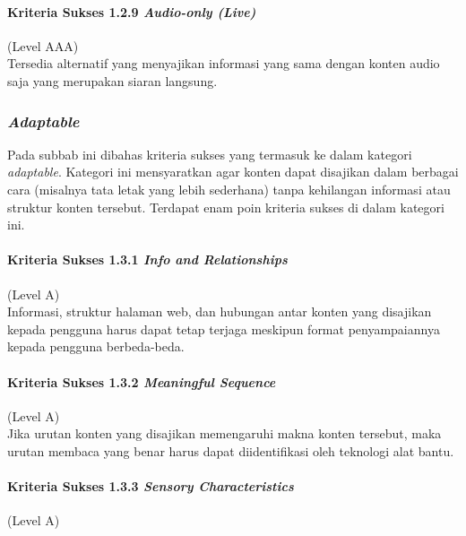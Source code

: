 \paragraph{Kriteria Sukses 1.2.9 \textit{Audio-only (Live)}}
\label{sec:kriteria_sukses_1.2.9}
(Level AAA)\\

Tersedia alternatif yang menyajikan informasi yang sama dengan konten audio saja yang merupakan siaran langsung.

\subsubsection{\textit{Adaptable}}
\label{sec:adaptable}
Pada subbab ini dibahas kriteria sukses yang termasuk ke dalam kategori \textit{adaptable}. Kategori ini mensyaratkan agar konten dapat disajikan dalam berbagai cara (misalnya tata letak yang lebih sederhana) tanpa kehilangan informasi atau struktur konten tersebut. Terdapat enam poin kriteria sukses di dalam kategori ini.

\paragraph{Kriteria Sukses 1.3.1 \textit{Info and Relationships}}
\label{sec:kriteria_sukses_1.3.1}
(Level A)\\

Informasi, struktur halaman web, dan hubungan antar konten yang disajikan kepada pengguna harus dapat tetap terjaga meskipun format penyampaiannya kepada pengguna berbeda-beda.

\paragraph{Kriteria Sukses 1.3.2 \textit{Meaningful Sequence}}
\label{sec:kriteria_sukses_1.3.2}
(Level A)\\

Jika urutan konten yang disajikan memengaruhi makna konten tersebut, maka urutan membaca yang benar harus dapat diidentifikasi oleh teknologi alat bantu.

\paragraph{Kriteria Sukses 1.3.3 \textit{Sensory Characteristics}}
\label{sec:kriteria_sukses_1.3.3}
(Level A)\\

